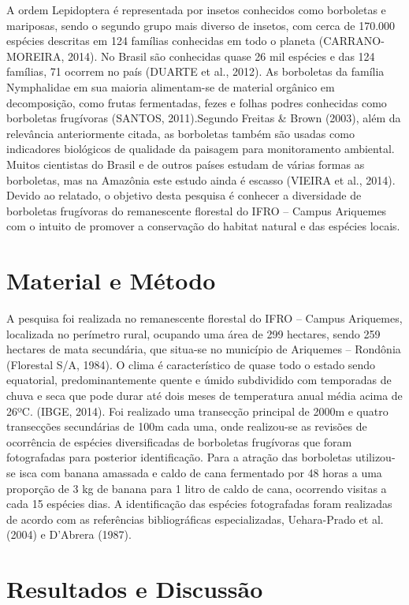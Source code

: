 \documentclass[article,12pt,onesidea,4paper,english,brazil]{abntex2}
\begin{document}
A ordem Lepidoptera é representada por insetos conhecidos como borboletas e mariposas, sendo o segundo grupo mais diverso de insetos, com cerca de 170.000 espécies descritas em 124 famílias conhecidas em todo o planeta (CARRANO- MOREIRA, 2014). No Brasil são conhecidas quase 26 mil espécies e das 124 famílias, 71 ocorrem no país (DUARTE et al., 2012). As borboletas da família Nymphalidae em sua maioria alimentam-se de material orgânico em decomposição, como frutas fermentadas, fezes e folhas podres conhecidas como borboletas frugívoras (SANTOS, 2011).Segundo Freitas \& Brown (2003), além da relevância anteriormente citada, as borboletas também são usadas como indicadores biológicos de qualidade da paisagem para monitoramento ambiental. Muitos cientistas do Brasil e de outros países estudam de várias formas as borboletas, mas na Amazônia este estudo ainda é escasso (VIEIRA et al., 2014). Devido ao relatado, o objetivo desta pesquisa é conhecer a diversidade de borboletas frugívoras do remanescente florestal do IFRO
– Campus Ariquemes com o intuito de promover a conservação do habitat natural e das espécies locais.

	
	\section*{Material e Método}
	
	A pesquisa foi realizada no remanescente florestal do IFRO – Campus Ariquemes, localizada no perímetro rural, ocupando uma área de 299 hectares, sendo 259 hectares de mata secundária, que situa-se no município de Ariquemes – Rondônia (Florestal S/A, 1984). O clima é característico de quase todo o estado sendo equatorial, predominantemente quente e úmido subdividido com temporadas de chuva e seca que pode durar até dois meses de temperatura anual média acima de 26ºC. (IBGE, 2014).
	Foi realizado uma transecção principal de 2000m e quatro transecções secundárias de 100m cada uma, onde realizou-se as revisões de ocorrência de espécies diversificadas de borboletas frugívoras que foram fotografadas para posterior identificação. Para a atração das borboletas utilizou-se isca com banana amassada e caldo de cana fermentado por 48 horas a uma proporção de 3 kg de banana para 1 litro de caldo de cana, ocorrendo visitas a cada 15 espécies dias.
	A identificação das espécies fotografadas foram realizadas de acordo com as referências bibliográficas especializadas, Uehara-Prado et al. (2004) e D’Abrera (1987).
	
	\section*{Resultados e Discussão}
	
\end{document}
